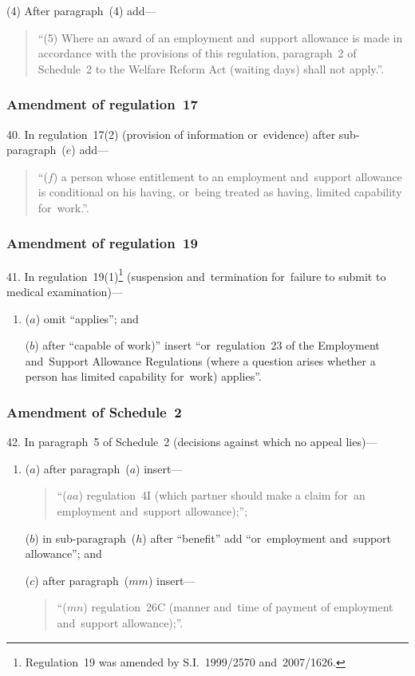 \documentclass[12pt,a4paper]{article}
\begin{document}
(4) After paragraph~(4) add—
\begin{quotation}
“(5) Where an award of an employment and~support allowance is made in accordance with the provisions of this regulation, paragraph~2 of Schedule~2 to the Welfare Reform Act (waiting days) shall not apply.”.
\end{quotation}

\subsubsection[40. Amendment of regulation~17]{Amendment of regulation~17}

40.  In regulation~17(2) (provision of information or~evidence) after sub-paragraph~($e$)  add—
\begin{quotation}
“($f$) a person whose entitlement to an employment and~support allowance is conditional on his having, or~being treated as having, limited capability for~work.”.
\end{quotation}

\subsubsection[41. Amendment of regulation~19]{Amendment of regulation~19}

41.  In regulation~19(1)\footnote{Regulation~19 was amended by S.I.~1999/2570 and~2007/1626.} (suspension and~termination for~failure to submit to medical examination)—
\begin{enumerate}\item[]
($a$) omit “applies”; and

($b$) after “capable of work)” insert “or~regulation~23 of the Employment and~Support Allowance Regulations (where a question arises whether a person has limited capability for~work) applies”.
\end{enumerate}

\subsubsection[42. Amendment of Schedule~2]{Amendment of Schedule~2}

42.  In paragraph~5 of Schedule~2 (decisions against which no appeal lies)—
\begin{enumerate}\item[]
($a$) after paragraph~($a$)  insert—
\begin{quotation}
“($aa$) regulation~4I (which partner should make a claim for~an employment and~support allowance);”;
\end{quotation}

($b$) in sub-paragraph~($h$)  after “benefit” add “or~employment and~support allowance”; and

($c$) after paragraph~($mm$)  insert—
\begin{quotation}
“($mn$) regulation~26C (manner and~time of payment of employment and~support allowance);”.
\end{quotation}
\end{enumerate}
\end{document}
